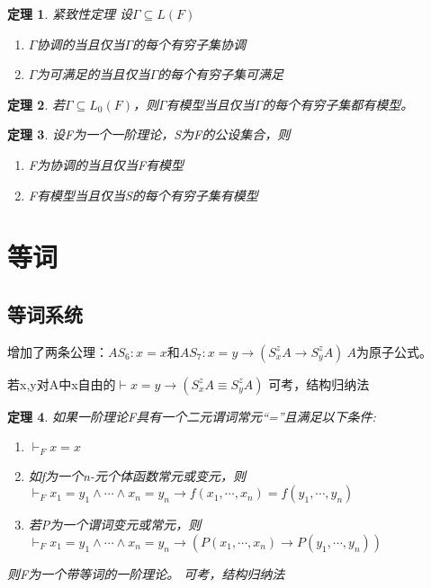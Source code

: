 \documentclass[a4paper]{ctexart}
\newtheorem{thm}{\hspace{2em}定理}[subsection]
\newcommand{\shade}[1]{\colorbox{shadecolor}{#1}}
\begin{document}
\begin{thm}
  紧致性定理 设$\Gamma\subseteq L(F)$
  \begin{enumerate}[itemindent=2em]
    \item $\Gamma$协调的当且仅当$\Gamma$的每个有穷子集协调
    \item $\Gamma$为可满足的当且仅当$\Gamma$的每个有穷子集可满足
  \end{enumerate}
\end{thm}

\begin{thm}
  若$\Gamma\subseteq L_0(F)$，则$\Gamma$有模型当且仅当$\Gamma$的每个有穷子集都有模型。
\end{thm}

\begin{thm}
  设F为一个一阶理论，S为F的公设集合，则
  \begin{enumerate}[itemindent=2em]
    \item F为协调的当且仅当F有模型
    \item F有模型当且仅当S的每个有穷子集有模型
  \end{enumerate}
\end{thm}

\section{等词}
\subsection{等词系统}
增加了两条公理：$AS_6: x=x$和$AS_7: x=y\rightarrow(S_x^zA\rightarrow S_y^zA)\ A\text{为原子公式}$。

若x,y对A中x自由的$\vdash x=y\rightarrow(S_x^zA\equiv S_y^zA)$ \shade{可考，结构归纳法}

\begin{thm}
  如果一阶理论F具有一个二元谓词常元“=”且满足以下条件:
  \begin{enumerate}[itemindent=2em]
    \item $\vdash_Fx=x$
    \item 如f为一个n-元个体函数常元或变元，则$\vdash_Fx_1=y_1\wedge\cdots\wedge x_n=y_n\rightarrow f(x_1,\cdots,x_n)=f(y_1,\cdots,y_n)$
    \item 若P为一个谓词变元或常元，则$\vdash_Fx_1=y_1\wedge\cdots\wedge x_n=y_n\rightarrow(P(x_1,\cdots,x_n)\rightarrow P(y_1,\cdots,y_n))$
  \end{enumerate}
  则F为一个带等词的一阶理论。  \shade{可考，结构归纳法}
\end{thm}
\end{document}
